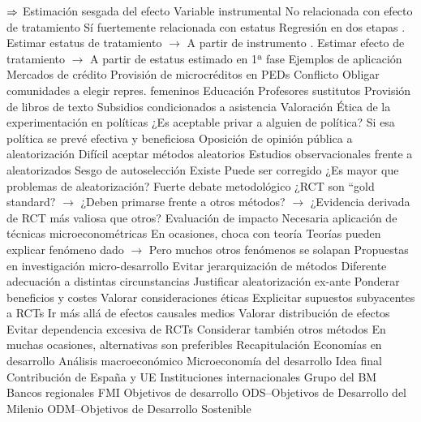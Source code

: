 \documentclass{nuevotema}
\begin{document}
\begin{esquemal}
				\4[] $\Rightarrow$ Estimación sesgada del efecto
				\4 Variable instrumental
				\4[] No relacionada con efecto de tratamiento
				\4[] Sí fuertemente relacionada con estatus
				\4 Regresión en dos etapas
				. Estimar estatus de tratamiento
				\4[] $\to$ A partir de instrumento
				. Estimar efecto de tratamiento
				\4[] $\to$ A partir de estatus estimado en 1ª fase
		\2 Ejemplos de aplicación
			\3 Mercados de crédito
				\4 Provisión de microcréditos en PEDs
			\3 Conflicto
				\4 Obligar comunidades a elegir repres. femeninos
			\3 Educación
				\4 Profesores sustitutos
				\4 Provisión de libros de texto
				\4 Subsidios condicionados a asistencia
		\2 Valoración
			\3 Ética de la experimentación en políticas
				\4 ¿Es aceptable privar a alguien de política?
				\4[] Si esa política se prevé efectiva y beneficiosa
			\3 Oposición de opinión pública a aleatorización
				\4 Difícil aceptar métodos aleatorios
			\3 Estudios observacionales frente a aleatorizados
				\4 Sesgo de autoselección
				\4[] Existe
				\4[] Puede ser corregido
				\4[] ¿Es mayor que problemas de aleatorización?
				\4 Fuerte debate metodológico
				\4[] ¿RCT son ``gold standard?
				\4[] $\to$ ¿Deben primarse frente a otros métodos?
				\4[] $\to$ ¿Evidencia derivada de RCT más valiosa que otros?
			\3 Evaluación de impacto
				\4 Necesaria aplicación de técnicas microeconométricas
				\4 En ocasiones, choca con teoría
				\4[] Teorías pueden explicar fenómeno dado
				\4[] $\to$ Pero muchos otros fenómenos se solapan
			\3 Propuestas en investigación micro-desarrollo
				\4[i] Evitar jerarquización de métodos
				\4[] Diferente adecuación a distintas circunstancias
				\4[ii] Justificar aleatorización ex-ante
				\4[] Ponderar beneficios y costes
				\4[] Valorar consideraciones éticas
				\4[iii] Explicitar supuestos subyacentes a RCTs
				\4[iv] Ir más allá de efectos causales medios
				\4[] Valorar distribución de efectos
				\4[v] Evitar dependencia excesiva de RCTs
				\4[] Considerar también otros métodos
				\4[] En muchas ocasiones, alternativas son preferibles
	\1[] 
		\2 Recapitulación
			\3 Economías en desarrollo
			\3 Análisis macroeconómico
			\3 Microeconomía del desarrollo
		\2 Idea final
			\3 Contribución de España y UE
			\3 Instituciones internacionales
				\4 Grupo del BM
				\4 Bancos regionales
				\4 FMI
			\3 Objetivos de desarrollo
				\4 ODS--Objetivos de Desarrollo del Milenio
				\4 ODM--Objetivos de Desarrollo Sostenible
\end{esquemal}
\end{document}
